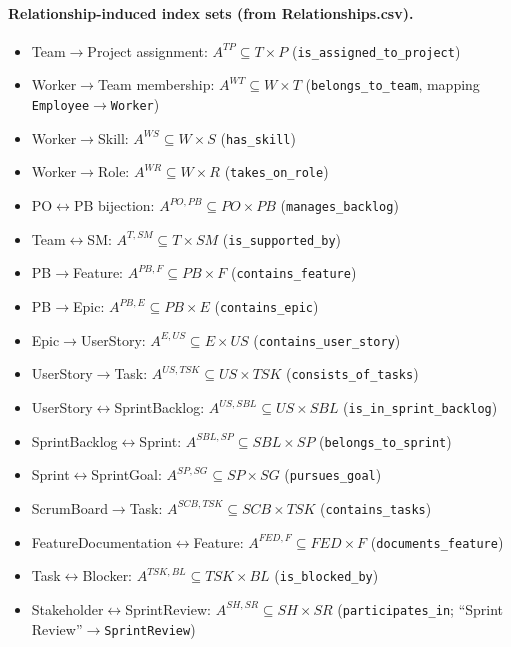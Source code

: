 \documentclass[11pt,a4paper]{article}
\begin{document}
\paragraph{Relationship-induced index sets (from Relationships.csv).}
\begin{itemize}[leftmargin=2em]
  \item Team$\to$Project assignment: $A^{TP}\subseteq T\times P$ (\texttt{is\_assigned\_to\_project})
  \item Worker$\to$Team membership: $A^{WT}\subseteq W\times T$ (\texttt{belongs\_to\_team}, mapping \texttt{Employee}$\to$\texttt{Worker})
  \item Worker$\to$Skill: $A^{WS}\subseteq W\times S$ (\texttt{has\_skill})
  \item Worker$\to$Role: $A^{WR}\subseteq W\times R$ (\texttt{takes\_on\_role})
  \item PO$\leftrightarrow$PB bijection: $A^{PO,PB}\subseteq PO\times PB$ (\texttt{manages\_backlog})
  \item Team$\leftrightarrow$SM: $A^{T,SM}\subseteq T\times SM$ (\texttt{is\_supported\_by})
  \item PB$\to$Feature: $A^{PB,F}\subseteq PB\times F$ (\texttt{contains\_feature})
  \item PB$\to$Epic: $A^{PB,E}\subseteq PB\times E$ (\texttt{contains\_epic})
  \item Epic$\to$UserStory: $A^{E,US}\subseteq E\times US$ (\texttt{contains\_user\_story})
  \item UserStory$\to$Task: $A^{US,TSK}\subseteq US\times TSK$ (\texttt{consists\_of\_tasks})
  \item UserStory$\leftrightarrow$SprintBacklog: $A^{US,SBL}\subseteq US\times SBL$ (\texttt{is\_in\_sprint\_backlog})
  \item SprintBacklog$\leftrightarrow$Sprint: $A^{SBL,SP}\subseteq SBL\times SP$ (\texttt{belongs\_to\_sprint})
  \item Sprint$\leftrightarrow$SprintGoal: $A^{SP,SG}\subseteq SP\times SG$ (\texttt{pursues\_goal})
  \item ScrumBoard$\to$Task: $A^{SCB,TSK}\subseteq SCB\times TSK$ (\texttt{contains\_tasks})
  \item FeatureDocumentation$\leftrightarrow$Feature: $A^{FED,F}\subseteq FED\times F$ (\texttt{documents\_feature})
  \item Task$\leftrightarrow$Blocker: $A^{TSK,BL}\subseteq TSK\times BL$ (\texttt{is\_blocked\_by})
  \item Stakeholder$\leftrightarrow$SprintReview: $A^{SH,SR}\subseteq SH\times SR$ (\texttt{participates\_in}; ``Sprint Review''$\to$\texttt{SprintReview})

\end{itemize}
\end{document}
